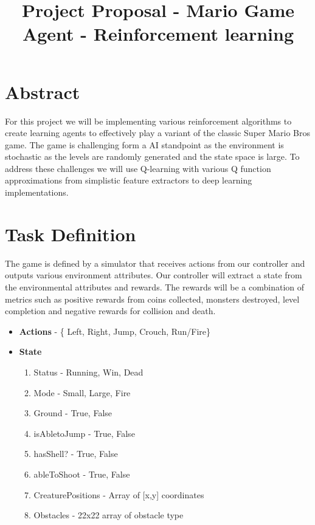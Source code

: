 \documentclass[12pt]{article}
\begin{document}
\title{Project Proposal - Mario Game Agent - Reinforcement learning}

\maketitle


\section{Abstract}

For this project we will be implementing various reinforcement algorithms to create learning agents to effectively play a variant of the classic Super Mario Bros game. The game is challenging form a AI standpoint as the environment is stochastic as the levels are randomly generated and the state space is large. To address these challenges we will use Q-learning with various Q function approximations from simplistic feature extractors to deep learning implementations.

\section{Task Definition}

The game is defined by a simulator that receives actions from our controller and outputs various environment attributes. Our controller will extract a state from the environmental attributes and rewards. The rewards will be a combination of metrics such as positive rewards from coins collected, monsters destroyed, level completion and negative rewards for collision and death.

\begin{itemize}
\item[] \textbf{Actions} - \{ Left, Right, Jump, Crouch, Run/Fire\}
\item[] \textbf{State}
\begin{enumerate}
\item[] Status - Running, Win, Dead
\item[] Mode - Small, Large, Fire
\item[] Ground - True, False
\item[] isAbletoJump - True, False
\item[] hasShell? - True, False
\item[] ableToShoot - True, False
\item[] CreaturePositions - Array of [x,y] coordinates
\item[] Obstacles - 22x22 array of obstacle type
\end{enumerate}
\end{itemize}
\end{document}

